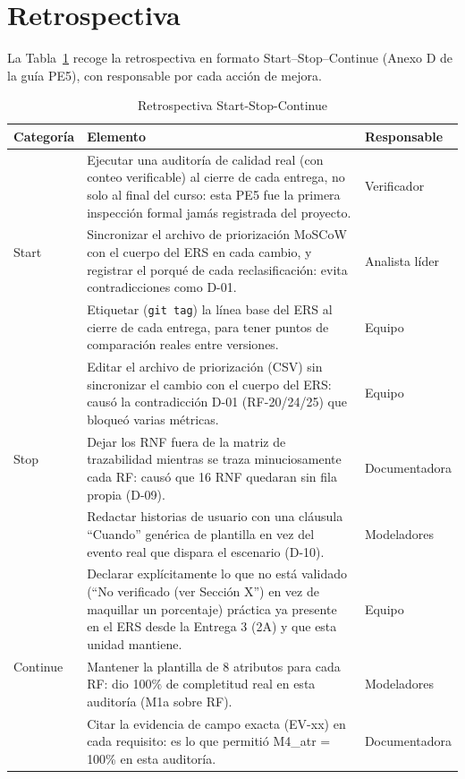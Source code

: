 \section{Retrospectiva}

La Tabla~\ref{tab:retro} recoge la retrospectiva en formato Start--Stop--Continue (Anexo D de la gu\'ia PE5), con responsable por cada acci\'on de mejora.

\begin{table}[H]
\centering
\small
\begin{tabular}{|l|p{9cm}|l|}
\hline
\textbf{Categor\'ia} & \textbf{Elemento} & \textbf{Responsable} \\ \hline
\multirow{3}{*}{Start} & Ejecutar una auditor\'ia de calidad real (con conteo verificable) al cierre de cada entrega, no solo al final del curso: esta PE5 fue la primera inspecci\'on formal jam\'as registrada del proyecto. & Verificador \\ \cline{2-3}
 & Sincronizar el archivo de priorizaci\'on MoSCoW con el cuerpo del ERS en cada cambio, y registrar el porqu\'e de cada reclasificaci\'on: evita contradicciones como D-01. & Analista l\'ider \\ \cline{2-3}
 & Etiquetar (\texttt{git tag}) la l\'inea base del ERS al cierre de cada entrega, para tener puntos de comparaci\'on reales entre versiones. & Equipo \\ \hline
\multirow{3}{*}{Stop} & Editar el archivo de priorizaci\'on (CSV) sin sincronizar el cambio con el cuerpo del ERS: caus\'o la contradicci\'on D-01 (RF-20/24/25) que bloque\'o varias m\'etricas. & Equipo \\ \cline{2-3}
 & Dejar los RNF fuera de la matriz de trazabilidad mientras se traza minuciosamente cada RF: caus\'o que 16 RNF quedaran sin fila propia (D-09). & Documentadora \\ \cline{2-3}
 & Redactar historias de usuario con una cl\'ausula ``Cuando'' gen\'erica de plantilla en vez del evento real que dispara el escenario (D-10). & Modeladores \\ \hline
\multirow{3}{*}{Continue} & Declarar expl\'icitamente lo que no est\'a validado (``No verificado (ver Secci\'on X'') en vez de maquillar un porcentaje) pr\'actica ya presente en el ERS desde la Entrega 3 (2A) y que esta unidad mantiene. & Equipo \\ \cline{2-3}
 & Mantener la plantilla de 8 atributos para cada RF: dio 100\% de completitud real en esta auditor\'ia (M1a sobre RF). & Modeladores \\ \cline{2-3}
 & Citar la evidencia de campo exacta (EV-xx) en cada requisito: es lo que permiti\'o M4\_atr = 100\% en esta auditor\'ia. & Documentadora \\ \hline
\end{tabular}
\caption{Retrospectiva Start-Stop-Continue}
\label{tab:retro}
\end{table}

